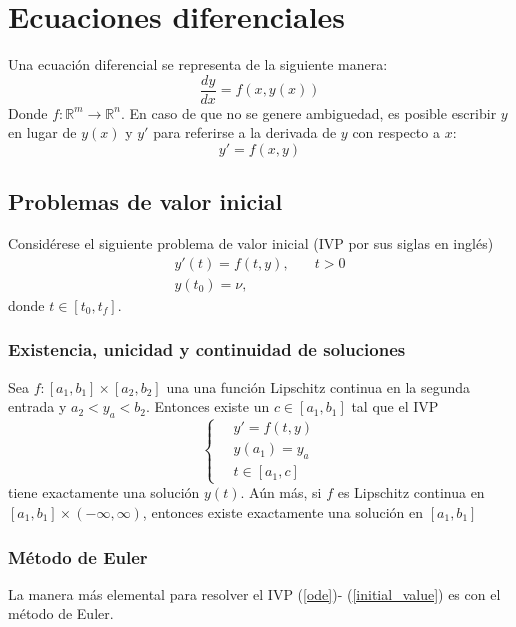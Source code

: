 

\chapter{Ecuaciones diferenciales}
Una ecuación diferencial se representa de la siguiente manera:
\begin{equation}
    \frac{dy}{dx} = f(x,y(x))
\end{equation}
Donde $f: \mathbb R^m \to \mathbb R^n$.
En caso de que no se genere ambiguedad, es posible escribir $y$ en lugar de $y(x)$ y $y'$ para referirse a la derivada de $y$ con respecto a $x$:
\begin{equation}
    y' = f(x,y)
\end{equation}

\section{Problemas de valor inicial}
Considérese el siguiente problema de valor inicial (IVP por sus siglas en inglés)
\begin{align}
    \label{ode} y'(t) = f(t,y),& \quad t>0\\
    \label{initial_value} y(t_0) = \nu,&
\end{align}
donde $t\in [t_0, t_f]$. 

\subsection{Existencia, unicidad y continuidad de soluciones}
\begin{theorem}
    Sea $f: [a_1,b_1] \times [a_2, b_2]$ una una función Lipschitz continua en la segunda entrada y $a_2 < y_a < b_2$. Entonces existe un $c\in [a_1, b_1]$ tal que el IVP
    \begin{equation}
        \left\{\quad \begin{matrix}
            y' = f(t,y) \\
            y(a_1) = y_a \\
            t \in [a_1,c]
        \end{matrix}\right.
    \end{equation} 
    tiene exactamente una solución $y(t)$. Aún más, si $f$ es Lipschitz continua en $[a_1, b_1]\times (-\infty, \infty)$, entonces existe exactamente una solución en $[a_1, b_1]$
\end{theorem}
\subsection{Método de Euler}
La manera más elemental para resolver el IVP (\ref{ode})- (\ref{initial_value}) es con el método de Euler. 

